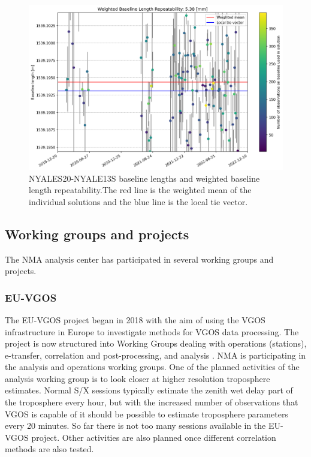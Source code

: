 \documentclass[twocolumn,twoside]{svmultivs_br} %
\begin{document}
\begin{figure}[htb!]         
  \begin{center}
  \includegraphics[width=16.0cm]{acnma01}
  \end{center}
  \caption{NYALES20-NYALE13S baseline lengths and weighted baseline length repeatability.The red line is the weighted mean of the
  individual solutions and the blue line is the local tie vector.}
  \label{fig:baseline}             
\end{figure}   

\subsection{Working groups and projects}
The NMA analysis center has participated in several working groups and projects. 

\subsubsection{EU-VGOS}
The EU-VGOS project began in 2018 with the aim of using the VGOS infrastructure in Europe
to investigate methods for VGOS data processing. The project is now structured into Working Groups dealing
with operations (stations), e-transfer, correlation and post-processing, and analysis \cite{ivsgm2022-euvgos}.
NMA is participating in the analysis and operations working groups. One of the planned activities of the analysis working group
is to look closer at higher resolution troposphere estimates. Normal S/X sessions typically estimate the zenith
wet delay part of the troposphere every hour, but with the increased number of observations that VGOS is capable of
it should be possible to estimate troposphere parameters every 20 minutes. So far there is not too many sessions 
available in the EU-VGOS project. Other activities are also planned once different correlation methods are also tested.
\end{document}
